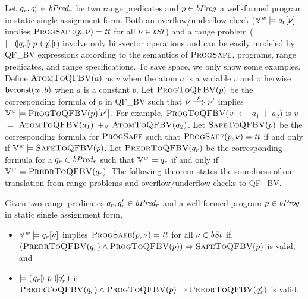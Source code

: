 Let $q_r, q_r' \in \mathit{bPred_r}$ be two range predicates and $p \in \mathit{bProg}$ a well-formed program in static single assignment form.
Both an overflow/underflow check ($\mathbb{V}^{\mathit{w}} \models q_r[\nu]$ implies $\textsc{ProgSafe}(p, \nu) = \mathit{tt}$ for all $\nu \in \mathit{bSt}$) and a range problem ($\models {(\!|}{q_r}{|\!)}~{p}~{(\!|}{q_r'}{|\!)}$) involve only bit-vector operations and can be easily modeled by QF\_BV expressions according to the semantics of $\textsc{ProgSafe}$, programs, range predicates, and range specifications.
To save space, we only show some examples.
Define $\textsc{AtomToQFBV}(a)$ as $v$ when the atom $a$ is a variable $v$ and otherwise $\mbox{\textsf{bvconst}}(w, b)$ when $a$ is a constant $b$.
Let $\textsc{ProgToQFBV}(p)$ be the corresponding formula of $p$ in QF\_BV such that $\nu \overset{p}{\Longrightarrow} \nu'$ implies $\mathbb{V}^{\mathit{w}} \models \textsc{ProgToQFBV}(p)[\nu']$.
For example, $\textsc{ProgToQFBV}($$v$ $\leftarrow$ $a_1$ $+$ $a_2)$ is $v$ $=$ $\textsc{AtomToQFBV}(a_1)$ $+_{\mathbb{V}}$ $\textsc{AtomToQFBV}(a_2)$.
Let $\textsc{SafeToQFBV}(p)$ be the corresponding formula for $\textsc{ProgSafe}$ such that $\textsc{ProgSafe}(p, \nu) = \mathit{tt}$ if and only if $\mathbb{V}^{\mathit{w}} \models \textsc{SafeToQFBV}(p)$.
Let $\textsc{PredrToQFBV}(q_r)$ be the corresponding formula for a $q_r \in \mathit{bPred_r}$ such that $\mathbb{V}^{\mathit{w}} \models q_r$ if and only if $\mathbb{V}^{\mathit{w}} \models \textsc{PredrToQFBV}(q_r)$.
The following theorem states the soundness of our translation from range problems and overflow/underflow checks to QF\_BV.

\begin{theorem}
Given two range predicates $q_r, q_r' \in \mathit{bPred_r}$ and a well-formed program $p \in \mathit{bProg}$ in static single assignment form,
\begin{itemize}
\item $\mathbb{V}^{\mathit{w}} \models q_r[\nu]$ implies $\textsc{ProgSafe}(p, \nu) = \mathit{tt}$ for all $\nu \in \mathit{bSt}$ if, $(\textsc{PredrToQFBV}(q_r) \wedge \textsc{ProgToQFBV}(p)) \Rightarrow \textsc{SafeToQFBV}(p)$ is valid, and
\item $\models {(\!|}{q_r}{|\!)}~{p}~{(\!|}{q_r'}{|\!)}$ if $\textsc{PredrToQFBV}(q_r) \wedge \textsc{ProgToQFBV}(p) \Rightarrow \textsc{PredrToQFBV}(q_r')$ is valid.
\end{itemize}
\label{theorem:to-qfbv}
\end{theorem}





